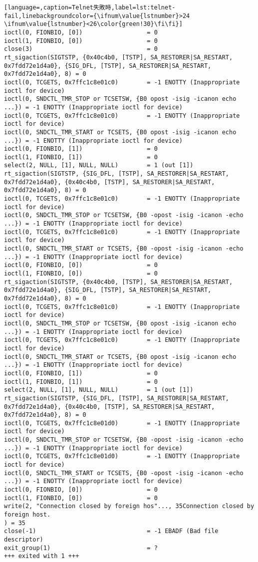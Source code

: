 \begin{lstlisting}[language=,caption=Telnet失敗時,label=lst:telnet-fail,linebackgroundcolor={\ifnum\value{lstnumber}>24 \ifnum\value{lstnumber}<26\color{green!30}\fi\fi}]
ioctl(0, FIONBIO, [0])                  = 0
ioctl(1, FIONBIO, [0])                  = 0
close(3)                                = 0
rt_sigaction(SIGTSTP, {0x40c4b0, [TSTP], SA_RESTORER|SA_RESTART, 0x7fdd72e1d4a0}, {SIG_DFL, [TSTP], SA_RESTORER|SA_RESTART, 0x7fdd72e1d4a0}, 8) = 0
ioctl(0, TCGETS, 0x7ffc1c8e01c0)        = -1 ENOTTY (Inappropriate ioctl for device)
ioctl(0, SNDCTL_TMR_STOP or TCSETSW, {B0 opost -isig -icanon echo ...}) = -1 ENOTTY (Inappropriate ioctl for device)
ioctl(0, TCGETS, 0x7ffc1c8e01c0)        = -1 ENOTTY (Inappropriate ioctl for device)
ioctl(0, SNDCTL_TMR_START or TCSETS, {B0 opost -isig -icanon echo ...}) = -1 ENOTTY (Inappropriate ioctl for device)
ioctl(0, FIONBIO, [1])                  = 0
ioctl(1, FIONBIO, [1])                  = 0
select(2, NULL, [1], NULL, NULL)        = 1 (out [1])
rt_sigaction(SIGTSTP, {SIG_DFL, [TSTP], SA_RESTORER|SA_RESTART, 0x7fdd72e1d4a0}, {0x40c4b0, [TSTP], SA_RESTORER|SA_RESTART, 0x7fdd72e1d4a0}, 8) = 0
ioctl(0, TCGETS, 0x7ffc1c8e01c0)        = -1 ENOTTY (Inappropriate ioctl for device)
ioctl(0, SNDCTL_TMR_STOP or TCSETSW, {B0 -opost -isig -icanon -echo ...}) = -1 ENOTTY (Inappropriate ioctl for device)
ioctl(0, TCGETS, 0x7ffc1c8e01c0)        = -1 ENOTTY (Inappropriate ioctl for device)
ioctl(0, SNDCTL_TMR_START or TCSETS, {B0 -opost -isig -icanon -echo ...}) = -1 ENOTTY (Inappropriate ioctl for device)
ioctl(0, FIONBIO, [0])                  = 0
ioctl(1, FIONBIO, [0])                  = 0
rt_sigaction(SIGTSTP, {0x40c4b0, [TSTP], SA_RESTORER|SA_RESTART, 0x7fdd72e1d4a0}, {SIG_DFL, [TSTP], SA_RESTORER|SA_RESTART, 0x7fdd72e1d4a0}, 8) = 0
ioctl(0, TCGETS, 0x7ffc1c8e01c0)        = -1 ENOTTY (Inappropriate ioctl for device)
ioctl(0, SNDCTL_TMR_STOP or TCSETSW, {B0 opost -isig -icanon echo ...}) = -1 ENOTTY (Inappropriate ioctl for device)
ioctl(0, TCGETS, 0x7ffc1c8e01c0)        = -1 ENOTTY (Inappropriate ioctl for device)
ioctl(0, SNDCTL_TMR_START or TCSETS, {B0 opost -isig -icanon echo ...}) = -1 ENOTTY (Inappropriate ioctl for device)
ioctl(0, FIONBIO, [1])                  = 0
ioctl(1, FIONBIO, [1])                  = 0
select(2, NULL, [1], NULL, NULL)        = 1 (out [1])
rt_sigaction(SIGTSTP, {SIG_DFL, [TSTP], SA_RESTORER|SA_RESTART, 0x7fdd72e1d4a0}, {0x40c4b0, [TSTP], SA_RESTORER|SA_RESTART, 0x7fdd72e1d4a0}, 8) = 0
ioctl(0, TCGETS, 0x7ffc1c8e01d0)        = -1 ENOTTY (Inappropriate ioctl for device)
ioctl(0, SNDCTL_TMR_STOP or TCSETSW, {B0 -opost -isig -icanon -echo ...}) = -1 ENOTTY (Inappropriate ioctl for device)
ioctl(0, TCGETS, 0x7ffc1c8e01d0)        = -1 ENOTTY (Inappropriate ioctl for device)
ioctl(0, SNDCTL_TMR_START or TCSETS, {B0 -opost -isig -icanon -echo ...}) = -1 ENOTTY (Inappropriate ioctl for device)
ioctl(0, FIONBIO, [0])                  = 0
ioctl(1, FIONBIO, [0])                  = 0
write(2, "Connection closed by foreign hos"..., 35Connection closed by foreign host.
) = 35
close(-1)                               = -1 EBADF (Bad file descriptor)
exit_group(1)                           = ?
+++ exited with 1 +++
\end{lstlisting}

